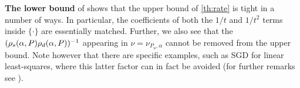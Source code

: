 \textbf{The lower bound} of  shows that the upper bound of \cref{th:rate} is tight in a number of ways.
In particular, the coefficients of both the $1/t$ and $1/t^2$ terms inside $\{ \cdot \}$ are essentially matched.
Further, we also see that the $(\rho_s(\alpha,P)\rho_d(\alpha,P))^{-1}$ appearing in $\nu = \nu_{P_u,\alpha}$ cannot be removed from the upper bound. 
Note however that there are specific examples, such as SGD for linear least-squares,
where this latter factor can in fact be avoided (for further remarks see ).
\begin{comment}
\subsection{The additive noise case and the deterministic case}
We end the section by presenting a result for the additive noise and deterministic case.
\begin{theorem}\label{th:add}
Let $P=(P^V,P^M)$ as in \Cref{def:dist} with $P^M$ being a point-mass distribution concentrated on $A\in \R^{\dcd}$. For $\alpha>0$ such that $\Lambda(I-\alpha A)<1$, we have
$\EE{\normsm{\thh_t-\ts}^2} = \frac{1}{(t+1)^2}\big((I-F_{t+1})(\theta_t-\ts)+\sum_{s=1}^t (I-F_{t+1-s})\zeta_{s}\big)^\top(\alpha A^{-1})^\top(\alpha A^{-1})\big((I-F_{t+1})(\theta_t-\ts)+\sum_{s=1}^t (I-F_{t+1-s})\zeta_{s}\big)
$
where $F_t\eqdef (I-\alpha A)^t$ is a deterministic matrix.
\end{theorem}
\begin{lemma}\label{th:det}
Let $P$ as in \Cref{def:dist} be a point-mass distribution with $P^M$ and $P^V$ concentrated on $A\in \R^{\dcd}$ and $b\in \R^{\dcd}$ respectively. Then, 
\begin{align*}
\normsm{\theta_t-\ts}^2=(\theta_t-\ts)^\top F^\top_t F_t (\theta_t-\ts)
\end{align*}
 \end{lemma} 
 \end{comment}
